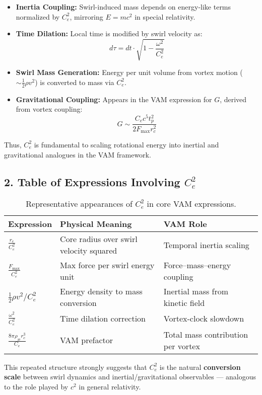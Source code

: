 \documentclass[a4paper, aps,preprint,superscriptaddress, 12pt]{revtex4}
\renewcommand{\arraystretch}{1.5}
\begin{document}
\begin{itemize}
    \item \textbf{Inertia Coupling:} Swirl-induced mass depends on energy-like terms normalized by \( C_e^2 \), mirroring \( E = mc^2 \) in special relativity.
    \item \textbf{Time Dilation:} Local time is modified by swirl velocity as:
    \[ d\tau = dt \cdot \sqrt{1 - \frac{\omega^2}{C_e^2}} \]

    \item \textbf{Swirl Mass Generation:} Energy per unit volume from vortex motion (\( \sim \frac{1}{2} \rho v^2 \)) is converted to mass via \( C_e^2 \).

    \item \textbf{Gravitational Coupling:} Appears in the VAM expression for \( G \), derived from vortex coupling:
    \[ G \sim \frac{C_e c^5 t_p^2}{2 F_{\text{max}} r_c^2} \]
\end{itemize}

Thus, \( C_e^2 \) is fundamental to scaling rotational energy into inertial and gravitational analogues in the VAM framework.

\subsection*{2. Table of Expressions Involving \( C_e^2 \)}

\begin{table}[H]
    \centering
    \footnotesize
    \renewcommand{\arraystretch}{1.3}
    \begin{tabular}{|l|l|l|}
        \hline
        \textbf{Expression} & \textbf{Physical Meaning} & \textbf{VAM Role} \\
        \hline
        $\frac{r_c}{C_e^2}$ & Core radius over swirl velocity squared & Temporal inertia scaling \\
        $\frac{F_{\text{max}}}{C_e^2}$ & Max force per swirl energy unit & Force–mass–energy coupling \\
        $\frac{1}{2} \rho v^2 / C_e^2$ & Energy density to mass conversion & Inertial mass from kinetic field \\
        $\frac{\omega^2}{C_e^2}$ & Time dilation correction & Vortex-clock slowdown \\
        $\frac{8\pi \rho_\text{\ae} r_c^3}{C_e}$ & VAM prefactor & Total mass contribution per vortex \\
        \hline
    \end{tabular}
    \caption{Representative appearances of \( C_e^2 \) in core VAM expressions.}\label{tab:table}
\end{table}

This repeated structure strongly suggests that \( C_e^2 \) is the natural \textbf{conversion scale} between swirl dynamics and inertial/gravitational observables — analogous to the role played by \( c^2 \) in general relativity.
\end{document}
